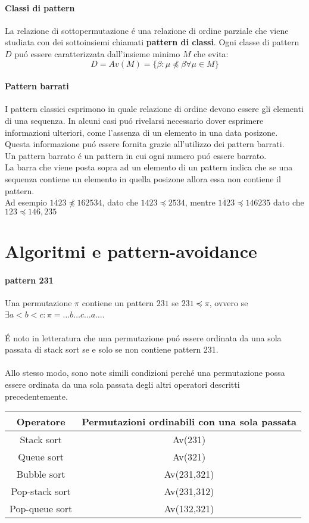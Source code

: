\paragraph*{Classi di pattern} La relazione di sottopermutazione \'e una relazione di ordine parziale che viene studiata con dei sottoinsiemi chiamati \textbf{pattern di classi}. Ogni classe di pattern $D$ pu\'o essere caratterizzata dall'insieme minimo $M$ che evita:$$ D = Av(M) = \{\beta:\mu\not\preceq\beta\forall\mu\in M\}$$
\paragraph*{Pattern barrati} I pattern classici esprimono in quale relazione di ordine devono essere gli elementi di una sequenza. In alcuni casi pu\'o rivelarsi necessario dover esprimere informazioni ulteriori, come l'assenza di un elemento in una data posizone. Questa informazione pu\'o essere fornita grazie all'utilizzo dei pattern barrati.\\
Un pattern barrato \'e un pattern in cui ogni numero pu\'o essere barrato.
\\La barra che viene posta sopra ad un elemento di un pattern indica che se una sequenza contiene un elemento in quella posizone allora essa non contiene il pattern.\\Ad esempio $1\overline{4}23\not\preceq 162534$, dato che $1423 \preceq 2534$, mentre $1\overline{4}23\preceq146235$ dato che $123\preceq146,235$
\section*{Algoritmi e pattern-avoidance}
\paragraph*{pattern 231}Una permutazione $\pi$ contiene un pattern $231$ se $231\preceq\pi$, ovvero se $\exists a<b<c: \pi =\dots{b}\dots{c}\dots{a}\dots$.\\\\
\'E noto in letteratura \cite{limbrief} che una permutazione pu\'o essere ordinata da una sola passata di stack sort se e solo se non contiene pattern 231.\\\\
Allo stesso modo, sono note simili condizioni perch\'e una permutazione possa essere ordinata da una sola passata degli altri operatori descritti precedentemente.\\
\begin{center}
\begin{tabular}{ |c|c| } 
\hline
\textbf{Operatore} & \textbf{Permutazioni ordinabili con una sola passata} \\ 
\hline
Stack sort & Av(231)\\ 
Queue sort & Av(321)\\ 
Bubble sort & Av(231,321)\\ 
Pop-stack sort & Av(231,312)\\ 
Pop-queue sort& Av(132,321)\\ 
\hline
\end{tabular}
\end{center}
